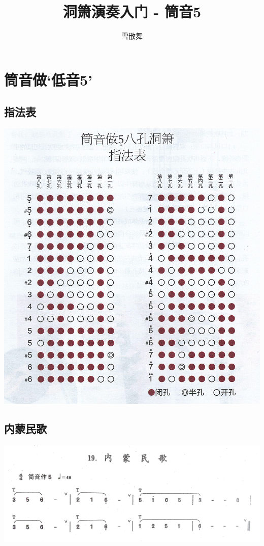\documentclass[cn,pad,chinese,chinesefont=nofont]{elegantbook}
\title{洞箫演奏入门 - 筒音5}
\author{雪散舞}
\date{\zhtoday}
\begin{document}
\maketitle
\frontmatter
\tableofcontents
\mainmatter

\centering
\chapter{筒音做‘低音5’}
\section{指法表}
\includegraphics[width=\textwidth]{dongxiao/Scan.jpeg}

\section{内蒙民歌}
	\includegraphics[width=\textwidth]{dongxiao/IMG0944内蒙民歌.jpg}  
\end{document}
